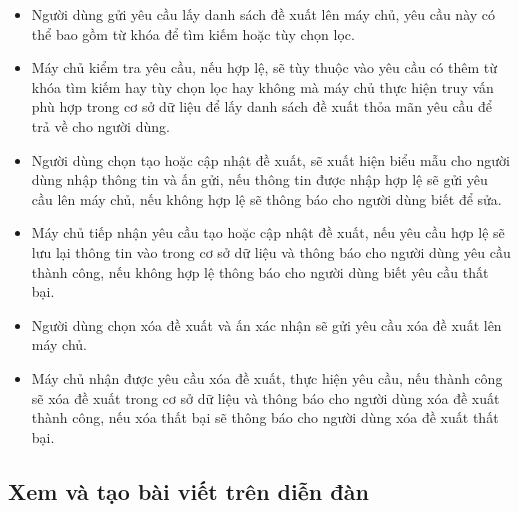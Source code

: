 \documentclass[./../main.tex]{subfiles}
\begin{document}
\begin{itemize}
    \item Người dùng gửi yêu cầu lấy danh sách đề xuất lên máy chủ, yêu cầu này có thể bao gồm từ khóa để tìm kiếm hoặc tùy chọn lọc.
    \item Máy chủ kiểm tra yêu cầu, nếu hợp lệ, sẽ tùy thuộc vào yêu cầu có thêm từ khóa tìm kiếm hay tùy chọn lọc hay không mà máy chủ thực hiện truy vấn phù hợp trong cơ sở dữ liệu để lấy danh sách đề xuất thỏa mãn yêu cầu để trả về cho người dùng.
    \item Người dùng chọn tạo hoặc cập nhật đề xuất, sẽ xuất hiện biểu mẫu cho người dùng nhập thông tin và ấn gửi, nếu thông tin được nhập hợp lệ sẽ gửi yêu cầu lên máy chủ, nếu không hợp lệ sẽ thông báo cho người dùng biết để sửa.
    \item Máy chủ tiếp nhận yêu cầu tạo hoặc cập nhật đề xuất, nếu yêu cầu hợp lệ sẽ lưu lại thông tin vào trong cơ sở dữ liệu và thông báo cho người dùng yêu cầu thành công, nếu không hợp lệ thông báo cho người dùng biết yêu cầu thất bại.
    \item Người dùng chọn xóa đề xuất và ấn xác nhận sẽ gửi yêu cầu xóa đề xuất lên máy chủ.
    \item Máy chủ nhận được yêu cầu xóa đề xuất, thực hiện yêu cầu, nếu thành công sẽ xóa đề xuất trong cơ sở dữ liệu và thông báo cho người dùng xóa đề xuất thành công, nếu xóa thất bại sẽ thông báo cho người dùng xóa đề xuất thất bại.
\end{itemize}

\subsection{Xem và tạo bài viết trên diễn đàn}
\end{document}
